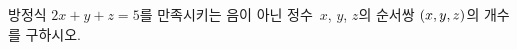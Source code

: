 방정식 $2x+y+z=5$를 만족시키는 음이 아닌 정수~$x$, $y$, $z$의 순서쌍 $(x{,}\mkern3mu\mathopen{}y{,}\mkern3mu\mathopen{}z)$의 개수를 구하시오.

